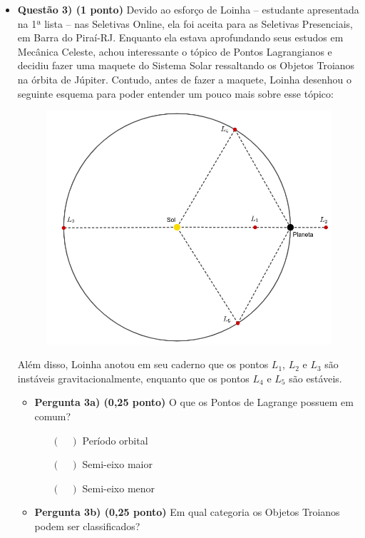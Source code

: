 \documentclass[a4paper, 12pt]{article}
\begin{document}
\begin{flushleft}
\begin{itemize}
		\item \textbf{Questão 3) (1 ponto)} Devido ao esforço de Loinha -- estudante apresentada na 1ª lista -- nas Seletivas Online, ela foi aceita para as Seletivas Presenciais, em Barra do Piraí-RJ. Enquanto ela estava aprofundando seus estudos em Mecânica Celeste, achou interessante o tópico de Pontos Lagrangianos e decidiu fazer uma maquete do Sistema Solar ressaltando os Objetos Troianos na órbita de Júpiter. \linebreak \linebreak
			Contudo, antes de fazer a maquete, Loinha desenhou o seguinte esquema para poder entender um pouco mais sobre esse tópico:
			\begin{figure}[H]
				\centering
				\includegraphics[scale=0.5]{./img/3.png}
			\end{figure}
			Além disso, Loinha anotou em seu caderno que os pontos $L_1$, $L_2$ e $L_3$ são instáveis gravitacionalmente, enquanto que os pontos $L_4$ e $L_5$ são estáveis.
			\begin{itemize}
				\item \textbf{Pergunta 3a) (0,25 ponto)} O que os Pontos de Lagrange possuem em comum?
					\begin{itemize}
						\item[$(\quad)$] Período orbital
						\item[$(\quad)$] Semi-eixo maior
						\item[$(\quad)$] Semi-eixo menor 
					\end{itemize}
				\item \textbf{Pergunta 3b) (0,25 ponto)} Em qual categoria os Objetos Troianos podem ser classificados?

\end{itemize}
\end{itemize}
\end{flushleft}
\end{document}
